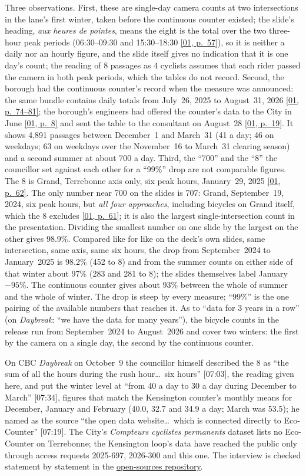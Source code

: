 \documentclass[11pt,letterpaper]{article}
\newcommand{\pagesurl}{https://openmobilitydata.github.io/Terrebonne-access-requests}
\newcommand{\osurl}{https://github.com/OpenMobilityData/Terrebonne-open-sources}
\newcommand{\pgl}[3]{\href{\pagesurl/\csname bundle#1\endcsname\#page=#2}{\textsf{\small[#1, p.~#3]}}}
\newcommand{\pg}[2]{\pgl{#1}{#2}{#2}}
\begin{document}
Three observations. First, these are single-day camera counts at two
intersections in the lane's first winter, taken before the continuous
counter existed; the slide's heading, \emph{aux heures de pointes}, means
the eight is the total over the two three-hour peak periods (06:30--09:30
and 15:30--18:30 \pg{01}{57}), so it is neither a daily nor an hourly
figure, and the slide itself gives no indication that it is one day's
count; the reading of 8 passages as 4 cyclists assumes that each rider
passed the camera in both peak periods, which the tables do not record.
Second, the borough had the continuous counter's record
when the measure was announced: the same bundle contains daily totals from
July~26, 2025 to August~31, 2026 \pgl{01}{74}{74--81}; the borough's
engineers had offered the counter's data to the City in June \pg{01}{8}
and sent the table to the consultant on August~28 \pg{01}{19}. It shows
4{,}891 passages between December~1 and March~31 (41 a day; 46 on
weekdays; 63 on weekdays over the November~16 to March~31 clearing season)
and a second summer at about 700 a day. Third, the ``700'' and the ``8''
the councillor set against each other for a ``99\%'' drop are not
comparable figures. The 8 is Grand, Terrebonne axis only, six peak hours,
January~29, 2025 \pg{01}{62}. The only number near 700 on the slides is
707: Grand, September~19, 2024, six peak hours, but \emph{all four
approaches}, including bicycles on Grand itself, which the 8 excludes
\pg{01}{61}; it is also the largest single-intersection count in the
presentation. Dividing the smallest number on one slide by the largest on
the other gives 98.9\%. Compared like for like on the deck's own slides,
same intersection, same axis, same six hours, the drop from September~2024
to January~2025 is 98.2\% (452 to 8) and from the summer counts on either
side of that winter about 97\% (283 and 281 to 8); the slides themselves
label January $-95$\%. The continuous counter gives about 93\% between the
whole of summer and the whole of winter. The drop is steep by every
measure; ``99\%'' is the one pairing of the available numbers that reaches
it. As to ``data for 3 years in a row'' (on \emph{Daybreak}: ``we have the
data for many years''), the bicycle counts in the release
run from September~2024 to August~2026 and cover two winters: the first by
the camera on a single day, the second by the continuous counter.

On CBC \emph{Daybreak} on October~9 the councillor himself described the
8 as ``the sum of all the hours during the rush hour\ldots\ six hours''
[07:03], the reading given here, and put the winter level at ``from 40 a
day to 30 a day during December to March'' [07:34], figures that match
the Kensington counter's monthly means for December, January and February
(40.0, 32.7 and 34.9 a day; March was 53.5); he named as the source ``the
open data website\ldots\ which is connected directly to Eco-Counter''
[07:19]. The City's \emph{Compteurs cyclistes permanents} dataset lists no
Eco-Counter on Terrebonne; the Kensington loop's data have reached the
public only through access requests 2025-697, 2026-300 and this one. The
interview is checked statement by statement in the
\href{\osurl/tree/main/2026-cbc-daybreak-interview}{open-sources repository}.
\end{document}
